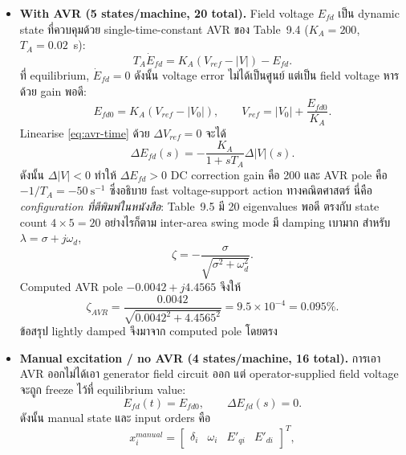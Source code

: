 \documentclass[12pt,a4paper]{article}
\begin{document}
\begin{itemize}
  \item \textbf{With AVR (5 states/machine, 20 total).} Field voltage $E_{fd}$ เป็น dynamic state ที่ควบคุมด้วย single-time-constant AVR ของ Table~9.4 ($K_A=200$, $T_A=0.02$~s):
  \begin{equation}
  T_A\dot E_{fd}=K_A(V_{ref}-|V|)-E_{fd}.
  \label{eq:avr-time}
  \end{equation}
  ที่ equilibrium, $\dot E_{fd}=0$ ดังนั้น voltage error ไม่ได้เป็นศูนย์ แต่เป็น field voltage หารด้วย gain พอดี:
  \begin{equation}
  E_{fd0}=K_A(V_{ref}-|V_0|),\qquad
  V_{ref}=|V_0|+\frac{E_{fd0}}{K_A}.
  \label{eq:avr-equilibrium}
  \end{equation}
  Linearise \eqref{eq:avr-time} ด้วย $\Delta V_{ref}=0$ จะได้
  \begin{equation}
  \Delta E_{fd}(s)=-\frac{K_A}{1+sT_A}\Delta|V|(s).
  \label{eq:avr-transfer}
  \end{equation}
  ดังนั้น $\Delta|V|<0$ ทำให้ $\Delta E_{fd}>0$ DC correction gain คือ 200 และ AVR pole คือ $-1/T_A=-50~\mathrm{s}^{-1}$ ซึ่งอธิบาย fast voltage-support action ทางคณิตศาสตร์ นี่คือ \emph{configuration ที่ตีพิมพ์ในหนังสือ}: Table~9.5 มี 20 eigenvalues พอดี ตรงกับ state count $4\times5=20$ อย่างไรก็ตาม inter-area swing mode มี damping เบามาก สำหรับ $\lambda=\sigma+j\omega_d$,
  \begin{equation}
  \zeta=-\frac{\sigma}{\sqrt{\sigma^2+\omega_d^2}}.
  \label{eq:damping-ratio}
  \end{equation}
  Computed AVR pole $-0.0042+j4.4565$ จึงให้
  \begin{equation}
  \zeta_{AVR}=\frac{0.0042}{\sqrt{0.0042^2+4.4565^2}}
  =9.5\times10^{-4}=0.095\%.
  \end{equation}
  ข้อสรุป lightly damped จึงมาจาก computed pole โดยตรง
  \item \textbf{Manual excitation / no AVR (4 states/machine, 16 total).} การเอา AVR ออกไม่ได้เอา generator field circuit ออก แต่ operator-supplied field voltage จะถูก freeze ไว้ที่ equilibrium value:
  \begin{equation}
  E_{fd}(t)=E_{fd0},\qquad \Delta E_{fd}(s)=0.
  \label{eq:manual-field}
  \end{equation}
  ดังนั้น manual state และ input orders คือ
  \begin{equation}
  x_i^{manual}=
  \begin{bmatrix}\delta_i&\omega_i&E'_{qi}&E'_{di}\end{bmatrix}^{T},

\end{equation}
\end{itemize}
\end{document}
